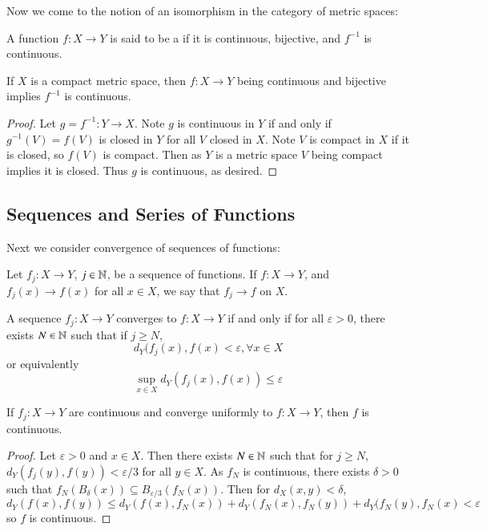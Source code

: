 Now we come to the notion of an isomorphism in the category of metric spaces:

\begin{definition}
    A function $f:X\rightarrow Y$ is said to be a  if it is continuous, bijective, and $f^{-1}$ is continuous.
\end{definition}

\begin{proposition}\label{prop:3.1.5}
    If $X$ is a compact metric space, then $f:X\rightarrow Y$ being continuous and bijective implies $f^{-1}$ is continuous.
\end{proposition}
\begin{proof}
    Let $g= f^{-1}:Y\rightarrow X$. Note $g$ is continuous in $Y$ if and only if $g^{-1}(V) = f(V)$ is closed in $Y$ for all $V$ closed in $X$. Note $V$ is compact in $X$ if it is closed, so $f(V)$ is compact. Then as $Y$ is a metric space $V$ being compact implies it is closed. Thus $g$ is continuous, as desired.
\end{proof}


\subsection{Sequences and Series of Functions}

Next we consider convergence of sequences of functions: 

\begin{definition}
    Let $f_j:X\rightarrow Y$, $j \in \mathbb N$, be a sequence of functions. If $f:X\rightarrow Y$, and $f_j(x)\rightarrow f(x)$ for all $x \in X$, we say that $f_j\rightarrow f$  on $X$.
\end{definition}

\begin{definition}
    A sequence $f_j:X\rightarrow Y$ converges  to $f:X\rightarrow Y$ if and only if for all $\varepsilon > 0$, there exists $N \in \mathbb N$ such that if $j \geq N$, $$d_Y(f_j(x),f(x) < \varepsilon,\forall x \in X$$ or equivalently $$\sup_{x \in X}d_Y(f_j(x),f(x)) \leq \varepsilon$$
\end{definition}

\begin{proposition}\label{prop:3.2.1}
    If $f_j:X\rightarrow Y$ are continuous and converge uniformly to $f:X\rightarrow Y$, then $f$ is continuous.
\end{proposition}
\begin{proof}
    Let $\varepsilon > 0$ and $x \in X$. Then there exists $N \in \mathbb N$ such that for $j \geq N$, $d_Y(f_j(y),f(y)) < \varepsilon/3$ for all $y \in X$. As $f_N$ is continuous, there exists $\delta > 0$ such that $f_N(B_{\delta}(x)) \subseteq B_{\varepsilon/3}(f_N(x))$. Then for $d_X(x,y) < \delta$, $$d_Y(f(x),f(y)) \leq d_Y(f(x),f_N(x)) + d_Y(f_N(x),f_N(y)) + d_Y(f_N(y),f_N(x) < \varepsilon$$ so $f$ is continuous.
\end{proof}

